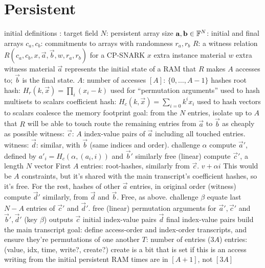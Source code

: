 \section{Persistent}
\begin{outline}
\1 initial definitions
  \2 \FF: target field
  \2 $N$: persistent array size
  \2 $\vec a, \vec b \in \FF^N$: initial and final arrays
  \2 $c_a, c_b$: commitments to arrays with randomness $r_a, r_b$
  \2 $R$: a witness relation $R(c_a, c_b, x, \vec a, \vec b, w, r_a, r_b)$ for a CP-SNARK
    \3 $x$ extra instance material
    \3 $w$ extra witness material
    \3 $\vec a$ represents the initial state of a RAM that $R$ makes $A$
    accesses to; $\vec b$ is the final state.
    \2 $A$: number of accesses 
  \2 $[A]$: $\{0, \dots, A-1\}$
  \2 hashes
    \3 root hash: $H_r(k, \vec x) = \prod_i (x_i - k)$
      \4 used for ``permutation arguments''
      \4 used to hash multisets to scalars
    \3 coefficient hash: $H_c(k, \vec x) = \sum_{i=0} k^ix_i$
      \4 used to hash vectors to scalars
\1 coalesce the memory footprint
  \2 goal: from the $N$ entries, isolate up to $A$ that $R$ will be able to
  touch
    \3 route the remaining entries from $\vec a$ to $\vec b$ as cheaply as
       possible
  \2 witness: $\vec c$: $A$ index-value pairs of $\vec a$ including all touched entries.
  \2 witness: $\vec d$: similar, with $\vec b$ (same indices and order).
  \2 challenge $\alpha$
  \2 compute $\vec a'$, defined by $a'_i = H_c(\alpha, (a_i, i))$ and $\vec b'$ similarly
    \3 free (linear)
  \2 compute $\vec c'$, a length $N$ vector
    \3 First $A$ entries: root-hashes, similarly from $\vec c$.
      \4 $v + \alpha i$
      \4 This would be $A$ constraints, but it's shared with the main
      transcript's coefficient hashes, so it's free.
    \3 For the rest, hashes of other $\vec a$ entries, in original order (witness)
  \2 compute $\vec d'$ similarly, from $\vec d$ and $\vec b$.
    \3 Free, as above.
  \2 challenge $\beta$
  \2 equate last $N-A$ entries of $\vec c'$ and $\vec d'$.
    \3 free (linear)
  \2 permutation arguments for $\vec a', \vec c'$ and $\vec b', \vec d'$ (key $\beta$)
    \3 
  \2 outputs
    \3 $\vec c$ initial index-value pairs
    \3 $\vec d$ final index-value pairs
\1 build the main transcript
  \2 goal: define access-order and index-order transcripts, and ensure they're
  permutations of one another
  \2 $T$: number of entries ($3A$)
  \2 entries: (value, idx, time, write?, create?)
    \3 create is a bit that is set if this is an access writing from the initial persistent RAM
    \3 times are in $[A+1]$, not $[3A]$

\end{outline}
